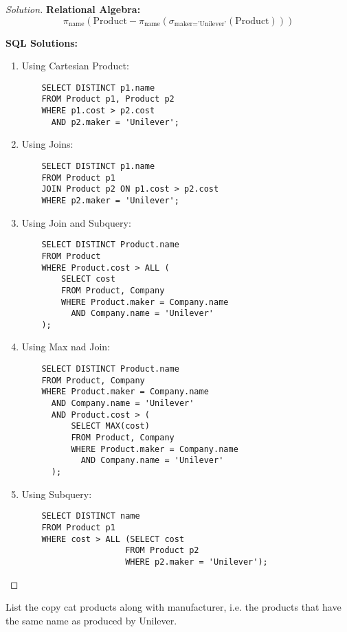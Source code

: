 \documentclass[10pt]{article}
\newenvironment{problem}[2][Problem]{\begin{trivlist}
\item[\hskip \labelsep {\bfseries #1}\hskip \labelsep {\bfseries #2.}]}{\end{trivlist}}
\begin{document}
\begin{proof}[Solution]
\textbf{Relational Algebra:}
\[
\pi_{\text{name}}\left(\text{Product} - \pi_{\text{name}}\left(\sigma_{\text{maker} = \text{'Unilever'}}(\text{Product})\right)\right)
\]

\textbf{SQL Solutions:}
\begin{enumerate}
    \item Using Cartesian Product:
    \begin{verbatim}
    SELECT DISTINCT p1.name
    FROM Product p1, Product p2
    WHERE p1.cost > p2.cost
      AND p2.maker = 'Unilever';
    \end{verbatim}
    
    \item Using Joins:
    \begin{verbatim}
    SELECT DISTINCT p1.name
    FROM Product p1
    JOIN Product p2 ON p1.cost > p2.cost
    WHERE p2.maker = 'Unilever';
    \end{verbatim}

    \item Using Join and Subquery:
    \begin{verbatim}
    SELECT DISTINCT Product.name
    FROM Product
    WHERE Product.cost > ALL (
        SELECT cost
        FROM Product, Company
        WHERE Product.maker = Company.name
          AND Company.name = 'Unilever'
    );
    \end{verbatim}
    
    \item Using Max nad Join:
    \begin{verbatim}
    SELECT DISTINCT Product.name
    FROM Product, Company
    WHERE Product.maker = Company.name
      AND Company.name = 'Unilever'
      AND Product.cost > (
          SELECT MAX(cost)
          FROM Product, Company
          WHERE Product.maker = Company.name
            AND Company.name = 'Unilever'
      );
    \end{verbatim}
    
    \item Using Subquery:
    \begin{verbatim}
    SELECT DISTINCT name
    FROM Product p1
    WHERE cost > ALL (SELECT cost
                     FROM Product p2
                     WHERE p2.maker = 'Unilever');
    \end{verbatim}
\end{enumerate}
\end{proof}


\begin{problem}{4}
List the copy cat products along with manufacturer, i.e. the products that have the same name as produced by Unilever.
\end{problem}
\end{document}
